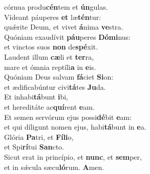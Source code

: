 \evenverse córnua produ\textbf{cén}tem et \textbf{ún}gulas.\\
\oddverse Vídeant páuperes \textbf{et} læ\textbf{tén}tur:~\*\\
\oddverse quǽrite Deum, et vivet \textbf{á}nima \textbf{ve}stra.\\
\evenverse Quóniam exaudívit \textbf{páu}peres \textbf{Dó}\textbf{mi}nus:~\*\\
\evenverse et vinctos suos \textbf{non} de\textbf{spé}xit.\\
\oddverse Laudent illum \textbf{cæ}li et \textbf{ter}ra,~\*\\
\oddverse mare et ómnia reptíli\textbf{a} in \textbf{e}is.\\
\evenverse Quóniam Deus salvam \textbf{fá}ciet \textbf{Si}on:~\*\\
\evenverse et ædificabúntur civi\textbf{tá}tes \textbf{Ju}da.\\
\oddverse Et inhabi\textbf{tá}bunt \textbf{i}bi,~\*\\
\oddverse et hereditáte ac\textbf{quí}rent \textbf{e}am.\\
\evenverse Et semen servórum ejus possi\textbf{dé}bit \textbf{e}am:~\*\\
\evenverse et qui díligunt nomen ejus, habi\textbf{tá}bunt in \textbf{e}a.\\
\oddverse Glória \textbf{Pa}tri, et \textbf{Fí}\textbf{li}o,~\*\\
\oddverse et Spi\textbf{rí}tui \textbf{San}cto.\\
\evenverse Sicut erat in princípio, et \textbf{nunc}, et \textbf{sem}per,~\*\\
\evenverse et in sǽcula sæcu\textbf{ló}rum. \textbf{A}men.\\
